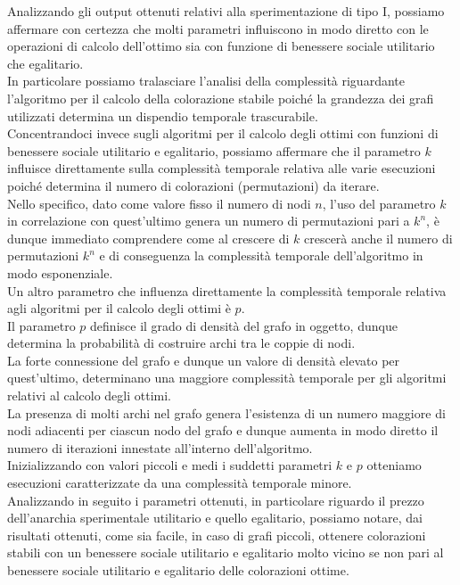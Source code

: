 Analizzando gli output ottenuti relativi alla sperimentazione di tipo I, possiamo affermare con certezza che molti parametri influiscono in modo diretto con le operazioni di calcolo dell'ottimo sia con funzione di benessere sociale utilitario che egalitario.\\
In particolare possiamo tralasciare l'analisi della complessità riguardante l'algoritmo per il calcolo della colorazione stabile poiché la grandezza dei grafi utilizzati determina un dispendio temporale trascurabile.\\

Concentrandoci invece sugli algoritmi per il calcolo degli ottimi con funzioni di benessere sociale utilitario e egalitario, possiamo affermare che il parametro $k$ influisce direttamente sulla complessità temporale relativa alle varie esecuzioni poiché determina il numero di colorazioni (permutazioni) da iterare.\\

Nello specifico, dato come valore fisso il numero di nodi $n$, l'uso del parametro $k$ in correlazione con quest'ultimo genera un numero di permutazioni pari a \(k^n\), è dunque immediato comprendere come al crescere di $k$ crescerà anche il numero di permutazioni \(k^n\) e di conseguenza la complessità temporale dell'algoritmo in modo esponenziale.\\

Un altro parametro che influenza direttamente la complessità temporale relativa agli algoritmi per il calcolo degli ottimi è $p$.\\
Il parametro $p$ definisce il grado di densità del grafo in oggetto, dunque determina la probabilità di costruire archi tra le coppie di nodi.\\
La forte connessione del grafo e dunque un valore di densità elevato per quest'ultimo, determinano una maggiore complessità temporale per gli algoritmi relativi al calcolo degli ottimi.\\
La presenza di molti archi nel grafo genera l'esistenza di un numero maggiore di nodi adiacenti per ciascun nodo del grafo e dunque aumenta in modo diretto il numero di iterazioni innestate all'interno dell'algoritmo.\\

Inizializzando con valori piccoli e medi i suddetti parametri $k$ e $p$ otteniamo esecuzioni caratterizzate da una complessità temporale minore.\\

Analizzando in seguito i parametri ottenuti, in particolare riguardo il prezzo dell'anarchia sperimentale utilitario e quello egalitario, possiamo notare, dai risultati ottenuti, come sia facile, in caso di grafi piccoli, ottenere colorazioni stabili con un benessere sociale utilitario e egalitario molto vicino se non pari al benessere sociale utilitario e egalitario delle colorazioni ottime.\\

